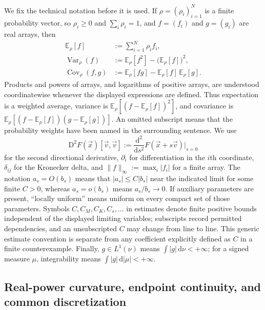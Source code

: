 \documentclass[aps,pra,11pt,onecolumn,nofootinbib,tightenlines]{revtex4-2}
\theoremstyle{definition}
\begin{document}
We fix the technical notation before it is used.  If
$\rho=(\rho_i)_{i=1}^N$ is a finite probability vector, so
$\rho_i\geq0$ and $\sum_i\rho_i=1$, and $f=(f_i)$ and
$g=(g_i)$ are real arrays, then
\begin{align}
\mathbb E_\rho[f]
&:=\sum_{i=1}^N\rho_i f_i,
\label{eq:technical-expectation-definition}\\
\operatorname{Var}_\rho(f)
&:=\mathbb E_\rho[f^2]-\bigl(\mathbb E_\rho[f]\bigr)^2,
\label{eq:technical-variance-definition}\\
\operatorname{Cov}_\rho(f,g)
&:=\mathbb E_\rho[fg]-\mathbb E_\rho[f]\,\mathbb E_\rho[g].
\label{eq:technical-covariance-definition}
\end{align}
Products and powers of arrays, and logarithms of positive arrays, are
understood coordinatewise whenever the displayed expressions are defined.
Thus expectation is a weighted average, variance is
$\mathbb E_\rho[(f-\mathbb E_\rho[f])^2]$, and covariance is
$\mathbb E_\rho[(f-\mathbb E_\rho[f])(g-\mathbb E_\rho[g])]$.
An omitted subscript means that the probability weights have been named in the
surrounding sentence.  We use
\begin{equation}
\mathrm D^2F(\vec x)[\vec v,\vec v]
:=\frac{\mathrm d^2}{\mathrm ds^2}F(\vec x+s\vec v)\bigg|_{s=0}
\label{eq:technical-directional-Hessian-definition}
\end{equation}
for the second directional derivative, $\partial_i$ for differentiation in the
$i$th coordinate, $\delta_{ij}$ for the Kronecker delta, and
$\|f\|_\infty:=\max_i|f_i|$ for a finite array.  The notation
$a_s=O(b_s)$ means that $|a_s|\leq C|b_s|$ near the indicated limit for some
finite $C>0$, whereas
$a_s=o(b_s)$ means $a_s/b_s\to0$.  If auxiliary parameters are present,
``locally uniform'' means uniform on every compact set of those parameters.
Symbols $C,C_M,C_K,C_s,\ldots$ in estimates denote finite positive bounds
independent of the displayed limiting variables; subscripts record permitted
dependencies, and an unsubscripted $C$ may change from line to line.  This
generic estimate convention is separate from any coefficient explicitly
defined as $C$ in a finite counterexample.  Finally, $g\in L^1(\nu)$ means
$\int|g|\,\mathrm d\nu<+\infty$; for a signed measure $\mu$, integrability means
$\int|g|\,\mathrm d|\mu|<+\infty$.

\subsection{Real-power curvature, endpoint continuity, and common discretization}
\label{app:measure-approximation}
\end{document}
